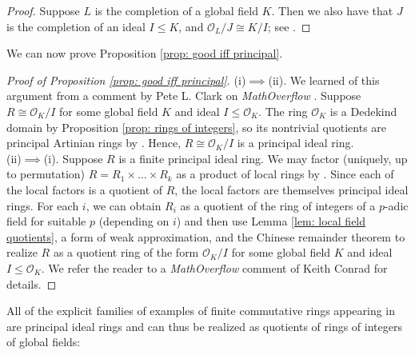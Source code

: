 \documentclass{amsart}
\theoremstyle{definition}
\numberwithin{equation}{section}
\newcommand{\mO}{\mathcal{O}}
\begin{document}
\begin{proof}
    Suppose $L$ is the completion of a global field $K$.
    Then we also have that $J$ is the completion of an ideal $I \le K$, and $\mO_L/J \cong K/I$; see \cite[Lemma 7.25]{milne}.
\end{proof}

We can now prove Proposition \ref{prop: good iff principal}.

\begin{proof}[Proof of Proposition \ref{prop: good iff principal}]
    (i)$\implies$(ii).
    We learned of this argument from a comment by Pete L. Clark on \emph{MathOverflow} \cite{clark_MO}.
    Suppose $R \cong \mO_K/I$ for some global field $K$ and ideal $I \le \mO_K$.
    The ring $\mO_K$ is a Dedekind domain by Proposition \ref{prop: rings of integers}, so its nontrivial quotients are principal Artinian rings by \cite[Theorem 20.11]{clark_book}.
    Hence, $R \cong \mO_K/I$ is a principal ideal ring. \\

    (ii)$\implies$(i).
    Suppose $R$ is a finite principal ideal ring.
    We may factor (uniquely, up to permutation) $R = R_1 \times \ldots \times R_k$ as a product of local rings by \cite[Theorem 3.1.4]{biniflamini}.
    Since each of the local factors is a quotient of $R$, the local factors are themselves principal ideal rings.
    For each $i$, we can obtain $R_i$ as a quotient of the ring of integers of a $p$-adic field for suitable $p$ (depending on $i$) and then use Lemma \ref{lem: local field quotients}, a form of weak approximation, and the Chinese remainder theorem to realize $R$ as a quotient ring of the form $\mO_K/I$ for some global field $K$ and ideal $I \le \mO_K$.
    We refer the reader to a \emph{MathOverflow} comment of Keith Conrad \cite{conrad_MO} for details.
\end{proof}

All of the explicit families of examples of finite commutative rings appearing in \cite{bb2} are principal ideal rings and can thus be realized as quotients of rings of integers of global fields:
\end{document}
